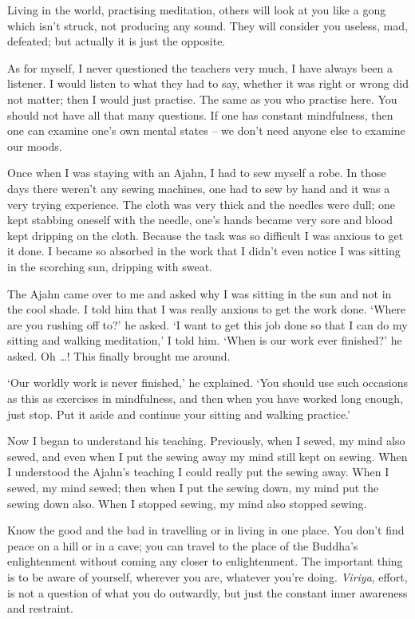 Living in the world, practising meditation, others will look at you like
a gong which isn't struck, not producing any sound. They will consider
you useless, mad, defeated; but actually it is just the opposite. 

As for myself, I never questioned the teachers very much, I have always
been a listener. I would listen to what they had to say, whether it was
right or wrong did not matter; then I would just practise. The same as
you who practise here. You should not have all that many questions. If
one has constant mindfulness, then one can examine one's own mental
states -- we don't need anyone else to examine our moods.

Once when I was staying with an Ajahn, I had to sew myself a robe. In
those days there weren't any sewing machines, one had to sew by hand and
it was a very trying experience. The cloth was very thick and the
needles were dull; one kept stabbing oneself with the needle, one's
hands became very sore and blood kept dripping on the cloth. Because the
task was so difficult I was anxious to get it done. I became so absorbed
in the work that I didn't even notice I was sitting in the scorching
sun, dripping with sweat.

The Ajahn came over to me and asked why I was sitting in the sun and not
in the cool shade. I told him that I was really anxious to get the work
done. `Where are you rushing off to?' he asked. `I want to get this job
done so that I can do my sitting and walking meditation,' I told him.
`When is our work ever finished?' he asked. Oh \ldots{}! This finally
brought me around.

`Our worldly work is never finished,' he explained. `You should use such
occasions as this as exercises in mindfulness, and then when you have
worked long enough, just stop. Put it aside and continue your sitting
and walking practice.'

Now I began to understand his teaching. Previously, when I sewed, my
mind also sewed, and even when I put the sewing away my mind still kept
on sewing. When I understood the Ajahn's teaching I could really put the
sewing away. When I sewed, my mind sewed; then when I put the sewing
down, my mind put the sewing down also. When I stopped sewing, my mind
also stopped sewing.

Know the good and the bad in travelling or in living in one place. You
don't find peace on a hill or in a cave; you can travel to the place of
the Buddha's enlightenment without coming any closer to enlightenment. 
The important thing is to be aware of yourself, wherever you are, 
whatever you're doing. \emph{Viriya}, effort, is not a question of what
you do outwardly, but just the constant inner awareness and restraint. 

